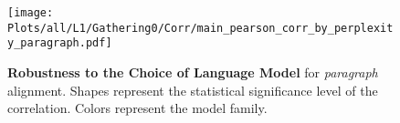 \begin{figure*}[ht]
    \centering
    \texttt{[image: Plots/all/L1/Gathering0/Corr/main\_pearson\_corr\_by\_perplexity\_paragraph.pdf]}
    \caption{\textbf{Robustness to the Choice of Language Model} for \textit{paragraph} alignment. Shapes represent the statistical significance level of the correlation. Colors represent the model family.}
    \label{fig:main_pearson_corr_by_perplexity_paragraph}
\end{figure*}
    